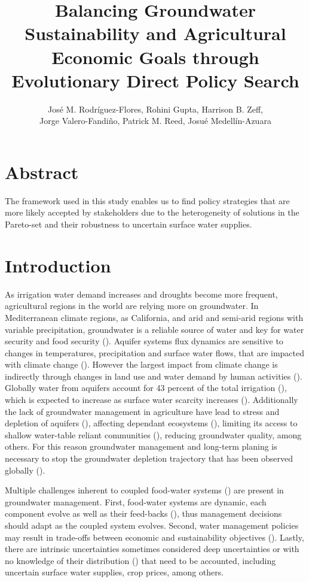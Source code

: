 \documentclass[11pt,a4paper]{article}
\title{Balancing Groundwater Sustainability and Agricultural Economic Goals through Evolutionary Direct Policy Search}
\author{José M. Rodríguez-Flores, Rohini Gupta, Harrison B. Zeff,  \\ Jorge Valero-Fandiño, Patrick M. Reed, Josué Medellín-Azuara}
\date{}
\begin{document}
\maketitle


\section*{Abstract}

The framework used in this study enables us to find policy strategies that are more likely accepted by stakeholders due to the heterogeneity of solutions in the Pareto-set and their robustness to uncertain surface water supplies. 
 
\section{Introduction}

As irrigation water demand increases and droughts become more frequent, agricultural regions in the world are relying more on groundwater. In Mediterranean climate regions, as California, and arid and semi-arid regions with variable precipitation, groundwater is a reliable source of water and key for water security and food security (\cite{priyan_issues_2021,malmgren_groundwater_2022}). Aquifer systems flux dynamics are sensitive to changes in temperatures, precipitation and surface water flows, that are impacted with climate change (\cite{clifton_water_2010,cuthbert_global_2019}). However the largest impact from climate change is indirectly through changes in land use and water demand by human activities (\cite{taylor_ground_2013}). Globally water from aquifers account for 43 percent of the total irrigation (\cite{siebert_groundwater_2010}), which is expected to increase as surface water scarcity increases (\cite{wada_nonsustainable_2012}). Additionally the lack of groundwater management in agriculture have lead to stress and depletion of aquifers (\cite{dalin_groundwater_2017, wada_global_2010}), affecting dependant ecosystems (\cite{bierkens_non-renewable_2019}), limiting its access to shallow water-table reliant communities (\cite{perrone_dry_2017,pauloo_domestic_2020}), reducing groundwater quality, among others. For this reason groundwater management and long-term planing is necessary to stop the groundwater depletion trajectory that has been observed globally (\cite{gorelick_global_2015}).

Multiple challenges inherent to coupled food-water systems (\cite{polhill_modelling_2016}) are present in groundwater management. First, food-water systems are dynamic, each component evolve as well as their feed-backs (\cite{filatova_regime_2016}), thus management decisions should adapt as the coupled system evolves. Second, water management policies may result in trade-offs between economic and sustainability objectives (\cite{mcdermid_minimizing_2021,torhan_tradeoffs_2022,young_hydrologic-economic_2021,stone_economic_2022}). Lastly, there are intrinsic uncertainties sometimes considered deep uncertainties or with no knowledge of their distribution (\cite{stirling_keep_2010}) that need to be accounted, including uncertain surface water supplies, crop prices, among others.  
\end{document}
